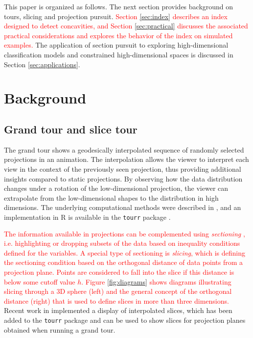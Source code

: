 \documentclass[]{interact}
\theoremstyle{plain}%
\theoremstyle{definition}
\theoremstyle{remark}
\begin{document}
This paper is organized as follows. The next section provides background
on tours, slicing and projection pursuit.
\textcolor{red}{Section \ref{sec:index} describes an index designed to detect concavities, and Section \ref{sec:practical} discusses the associated practical considerations and explores the behavior of the index on simulated examples.}
The application of section pursuit to exploring high-dimensional
classification models and constrained high-dimensional spaces is
discussed in Section \ref{sec:applications}.

\hypertarget{background}{%
\section{\texorpdfstring{Background
\label{sec:background}}{Background }}\label{background}}

\hypertarget{grand-tour-and-slice-tour}{%
\subsection{Grand tour and slice tour}\label{grand-tour-and-slice-tour}}

The grand tour shows a geodesically interpolated sequence of randomly
selected projections in an animation. The interpolation allows the
viewer to interpret each view in the context of the previously seen
projection, thus providing additional insights compared to static
projections. By observing how the data distribution changes under a
rotation of the low-dimensional projection, the viewer can extrapolate
from the low-dimensional shapes to the distribution in high dimensions.
The underlying computational methods were described in \citet{BCAH05},
and an implementation in R \citep{rlang} is available in the
\texttt{tourr} package \citep{tourr}.

\textcolor{red}{The information available in projections can be complemented using \textit{sectioning}}
\citet{prosection}
\textcolor{red}{, i.e. highlighting or dropping subsets of the data based on inequality conditions defined for the variables. A special type of sectioning is \textit{slicing}, which is defining the sectioning condition based on the orthogonal distance of data points from a projection plane. Points are considered to fall into the slice if this distance is below some cutoff value $h$. Figure \ref{fig:diagrams} shows diagrams illustrating slicing through a 3D sphere (left) and the general concept of the orthogonal distance (right) that is used to define slices in more than three dimensions.}
Recent work in \citet{laa2019slice} implemented a display of
interpolated slices, which has been added to the \texttt{tourr} package
and can be used to show slices for projection planes obtained when
running a grand tour.
\end{document}

